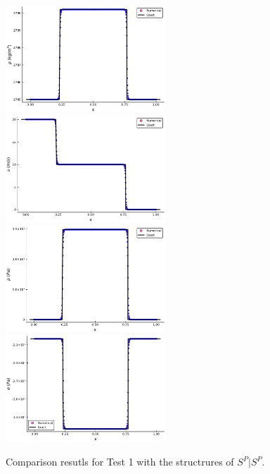 \documentclass[review]{elsarticle}
\begin{document}
\begin{enumerate}[Step 1]
\begin{figure}
  \includegraphics[width= 6cm] {case1rho.pdf}
  \includegraphics[width= 6cm] {case1u.pdf}
  \includegraphics[width= 6cm] {case1p.pdf}
  \includegraphics[width= 6cm] {case1sigma.pdf}

    \caption{Comparison resutls for Test 1 with the structrures of $S^P|S^P$.  }
  \label{fig:case1}
\end{figure}

\end{enumerate}
\end{document}
